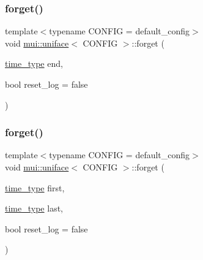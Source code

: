 \mbox{\label{classmui_1_1uniface_ad961705e00b7e217556e9e26bef28f75}} 
\subsubsection{\texorpdfstring{forget()}{forget()}\hspace{0.1cm}{\footnotesize\ttfamily [1/2]}}
{\footnotesize\ttfamily template$<$typename C\+O\+N\+F\+IG  = default\+\_\+config$>$ \\
void \hyperlink{classmui_1_1uniface}{mui\+::uniface}$<$ C\+O\+N\+F\+IG $>$\+::forget (\begin{DoxyParamCaption}\item[{\hyperlink{classmui_1_1uniface_a65cbecf1936d7d61cb45f14b1138dc07}{time\+\_\+type}}]{end,  }\item[{bool}]{reset\+\_\+log = {\ttfamily false} }\end{DoxyParamCaption})\hspace{0.3cm}{\ttfamily [inline]}}

\mbox{\label{classmui_1_1uniface_a0b502166a7dd9ca84912d8ad08237453}} 
\subsubsection{\texorpdfstring{forget()}{forget()}\hspace{0.1cm}{\footnotesize\ttfamily [2/2]}}
{\footnotesize\ttfamily template$<$typename C\+O\+N\+F\+IG  = default\+\_\+config$>$ \\
void \hyperlink{classmui_1_1uniface}{mui\+::uniface}$<$ C\+O\+N\+F\+IG $>$\+::forget (\begin{DoxyParamCaption}\item[{\hyperlink{classmui_1_1uniface_a65cbecf1936d7d61cb45f14b1138dc07}{time\+\_\+type}}]{first,  }\item[{\hyperlink{classmui_1_1uniface_a65cbecf1936d7d61cb45f14b1138dc07}{time\+\_\+type}}]{last,  }\item[{bool}]{reset\+\_\+log = {\ttfamily false} }\end{DoxyParamCaption})\hspace{0.3cm}{\ttfamily [inline]}}


